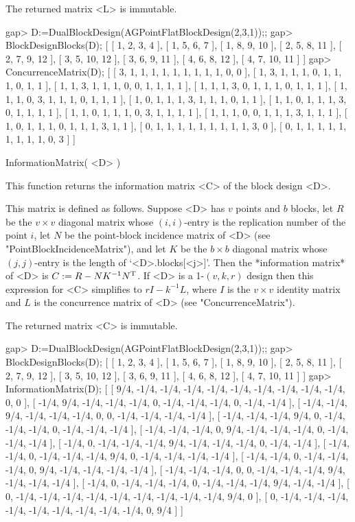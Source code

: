 The returned matrix <L> is immutable.

\beginexample
gap> D:=DualBlockDesign(AGPointFlatBlockDesign(2,3,1));;
gap> BlockDesignBlocks(D);
[ [ 1, 2, 3, 4 ], [ 1, 5, 6, 7 ], [ 1, 8, 9, 10 ], [ 2, 5, 8, 11 ], 
  [ 2, 7, 9, 12 ], [ 3, 5, 10, 12 ], [ 3, 6, 9, 11 ], [ 4, 6, 8, 12 ], 
  [ 4, 7, 10, 11 ] ]
gap> ConcurrenceMatrix(D);
[ [ 3, 1, 1, 1, 1, 1, 1, 1, 1, 1, 0, 0 ], 
  [ 1, 3, 1, 1, 1, 0, 1, 1, 1, 0, 1, 1 ], 
  [ 1, 1, 3, 1, 1, 1, 0, 0, 1, 1, 1, 1 ], 
  [ 1, 1, 1, 3, 0, 1, 1, 1, 0, 1, 1, 1 ], 
  [ 1, 1, 1, 0, 3, 1, 1, 1, 0, 1, 1, 1 ], 
  [ 1, 0, 1, 1, 1, 3, 1, 1, 1, 0, 1, 1 ], 
  [ 1, 1, 0, 1, 1, 1, 3, 0, 1, 1, 1, 1 ], 
  [ 1, 1, 0, 1, 1, 1, 0, 3, 1, 1, 1, 1 ], 
  [ 1, 1, 1, 0, 0, 1, 1, 1, 3, 1, 1, 1 ], 
  [ 1, 0, 1, 1, 1, 0, 1, 1, 1, 3, 1, 1 ], 
  [ 0, 1, 1, 1, 1, 1, 1, 1, 1, 1, 3, 0 ], 
  [ 0, 1, 1, 1, 1, 1, 1, 1, 1, 1, 0, 3 ] ]
\endexample

\>InformationMatrix( <D> )

This function returns the information matrix <C> of the block design <D>.

This matrix is defined as follows. Suppose <D> has $v$ points and $b$
blocks, let $R$ be the $v\times v$ diagonal matrix whose $(i,i)$-entry
is the replication number of the point $i$, let $N$ be the point-block
incidence matrix of <D> (see "PointBlockIncidenceMatrix"), and let $K$
be the $b\times b$ diagonal matrix whose $(j,j)$-entry is the length of
`<D>.blocks[<j>]'. Then the *information matrix* of <D> is 
$C:=R-NK^{-1}N^{\rm T}$. If <D> is a 1-$(v,k,r)$ design then this expression
for <C> simplifies to $rI-k^{-1}L$, where $I$ is the $v\times v$ identity
matrix and $L$ is the concurrence matrix of <D> (see "ConcurrenceMatrix").

The returned matrix <C> is immutable.

\beginexample
gap> D:=DualBlockDesign(AGPointFlatBlockDesign(2,3,1));;
gap> BlockDesignBlocks(D);
[ [ 1, 2, 3, 4 ], [ 1, 5, 6, 7 ], [ 1, 8, 9, 10 ], [ 2, 5, 8, 11 ], 
  [ 2, 7, 9, 12 ], [ 3, 5, 10, 12 ], [ 3, 6, 9, 11 ], [ 4, 6, 8, 12 ], 
  [ 4, 7, 10, 11 ] ]
gap> InformationMatrix(D);
[ [ 9/4, -1/4, -1/4, -1/4, -1/4, -1/4, -1/4, -1/4, -1/4, -1/4, 0, 0 ], 
  [ -1/4, 9/4, -1/4, -1/4, -1/4, 0, -1/4, -1/4, -1/4, 0, -1/4, -1/4 ], 
  [ -1/4, -1/4, 9/4, -1/4, -1/4, -1/4, 0, 0, -1/4, -1/4, -1/4, -1/4 ], 
  [ -1/4, -1/4, -1/4, 9/4, 0, -1/4, -1/4, -1/4, 0, -1/4, -1/4, -1/4 ], 
  [ -1/4, -1/4, -1/4, 0, 9/4, -1/4, -1/4, -1/4, 0, -1/4, -1/4, -1/4 ], 
  [ -1/4, 0, -1/4, -1/4, -1/4, 9/4, -1/4, -1/4, -1/4, 0, -1/4, -1/4 ], 
  [ -1/4, -1/4, 0, -1/4, -1/4, -1/4, 9/4, 0, -1/4, -1/4, -1/4, -1/4 ], 
  [ -1/4, -1/4, 0, -1/4, -1/4, -1/4, 0, 9/4, -1/4, -1/4, -1/4, -1/4 ], 
  [ -1/4, -1/4, -1/4, 0, 0, -1/4, -1/4, -1/4, 9/4, -1/4, -1/4, -1/4 ], 
  [ -1/4, 0, -1/4, -1/4, -1/4, 0, -1/4, -1/4, -1/4, 9/4, -1/4, -1/4 ], 
  [ 0, -1/4, -1/4, -1/4, -1/4, -1/4, -1/4, -1/4, -1/4, -1/4, 9/4, 0 ], 
  [ 0, -1/4, -1/4, -1/4, -1/4, -1/4, -1/4, -1/4, -1/4, -1/4, 0, 9/4 ] ]
\endexample


